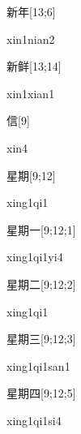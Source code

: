 \begin{verbete}{新年}[13;6]
\begin{pronuncia}{xin1nian2}
\end{pronuncia}
\end{verbete}

\begin{verbete}{新鲜}[13;14]
\begin{pronuncia}{xin1xian1}
\end{pronuncia}
\end{verbete}

\begin{verbete}[xin4]{信}[9]
\begin{pronuncia}{xin4}
\end{pronuncia}
\end{verbete}

\begin{verbete}[xing1qi1]{星期}[9;12]
\begin{pronuncia}{xing1qi1}
\end{pronuncia}
\end{verbete}

\begin{verbete}[xing1qi1yi4]{星期一}[9;12;1]
\begin{pronuncia}{xing1qi1yi4}
\end{pronuncia}
\end{verbete}

\begin{verbete}[xing1qi1]{星期二}[9;12;2]
\begin{pronuncia}{xing1qi1}
\end{pronuncia}
\end{verbete}

\begin{verbete}{星期三}[9;12;3]
\begin{pronuncia}{xing1qi1san1}
\end{pronuncia}
\end{verbete}

\begin{verbete}[xing1qi1si4]{星期四}[9;12;5]
\begin{pronuncia}{xing1qi1si4}
\end{pronuncia}
\end{verbete}

